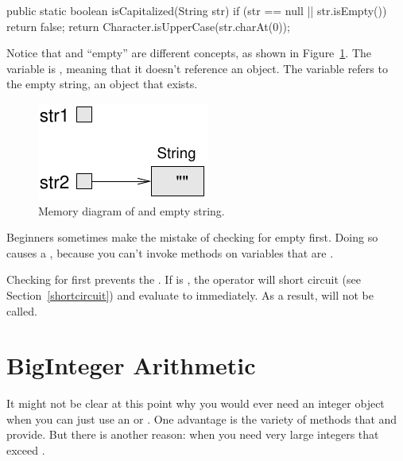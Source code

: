 \begin{code}
public static boolean isCapitalized(String str) {
    if (str == null || str.isEmpty()) {
        return false;
    }
    return Character.isUpperCase(str.charAt(0));
}
\end{code}

Notice that  and ``empty'' are different concepts, as shown in Figure~\ref{fig.nullempty}.
The variable  is , meaning that it doesn't reference an object.
The variable  refers to the empty string, an object that exists.

\begin{figure}[!ht]
\begin{center}
\includegraphics{figs/nullempty.pdf}
\caption{Memory diagram of  and empty string.}
\label{fig.nullempty}
\end{center}
\end{figure}

Beginners sometimes make the mistake of checking for empty first.
Doing so causes a , because you can't invoke methods on variables that are .

\begin{code}
if (str.isEmpty() || str == null) {    // wrong!
\end{code}


Checking for  first prevents the .
If  is , the \java{||} operator will short circuit (see Section~\ref{shortcircuit}) and evaluate to  immediately.
As a result,  will not be called.


\section{BigInteger Arithmetic}

It might not be clear at this point why you would ever need an integer object when you can just use an  or .
One advantage is the variety of methods that  and  provide.
But there is another reason: when you need very large integers that exceed .

